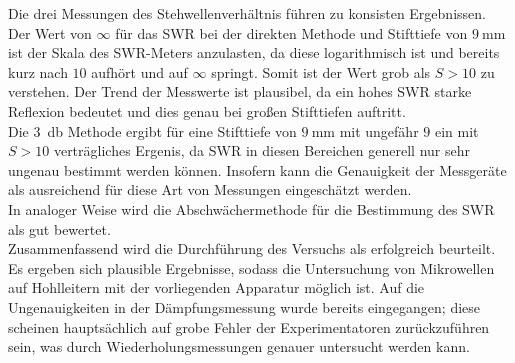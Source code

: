 Die drei Messungen des Stehwellenverhältnis führen zu konsisten Ergebnissen. Der Wert von $\infty$ für das SWR bei der direkten Methode und Stifttiefe von $\SI{9}{\milli\meter}$ ist der Skala des SWR-Meters anzulasten, da diese logarithmisch ist und bereits kurz nach $10$ aufhört und auf $\infty$ springt. Somit ist der Wert grob als $S > 10$ zu verstehen. Der Trend der Messwerte ist plausibel, da ein hohes SWR starke Reflexion bedeutet und dies genau bei großen Stifttiefen auftritt.\\
Die \SI{3}{\decibel} Methode ergibt für eine Stifttiefe von $\SI{9}{\milli\meter}$ mit ungefähr $9$ ein mit $S > 10$ verträgliches Ergenis, da SWR in diesen Bereichen generell nur sehr ungenau bestimmt werden können. Insofern kann die Genauigkeit der Messgeräte als ausreichend für diese Art von Messungen eingeschätzt werden.\\
In analoger Weise wird die Abschwächermethode für die Bestimmung des SWR als gut bewertet.\\
Zusammenfassend wird die Durchführung des Versuchs als erfolgreich beurteilt. Es ergeben sich plausible Ergebnisse, sodass die Untersuchung von Mikrowellen auf Hohlleitern mit der vorliegenden Apparatur möglich ist. Auf die Ungenauigkeiten in der Dämpfungsmessung wurde bereits eingegangen; diese scheinen hauptsächlich auf grobe Fehler der Experimentatoren zurückzuführen sein, was durch Wiederholungsmessungen genauer untersucht werden kann.
